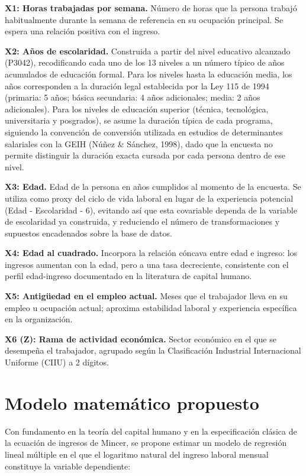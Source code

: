\documentclass[
  spanish,
  letterpaper,
  DIV=11,
  numbers=noendperiod]{scrartcl}
\begin{document}
\textbf{X1: Horas trabajadas por semana.} Número de horas que la persona
trabajó habitualmente durante la semana de referencia en su ocupación
principal. Se espera una relación positiva con el ingreso.

\textbf{X2: Años de escolaridad.} Construida a partir del nivel
educativo alcanzado (P3042), recodificando cada uno de los 13 niveles a
un número típico de años acumulados de educación formal. Para los
niveles hasta la educación media, los años corresponden a la duración
legal establecida por la Ley 115 de 1994 (primaria: 5 años; básica
secundaria: 4 años adicionales; media: 2 años adicionales). Para los
niveles de educación superior (técnica, tecnológica, universitaria y
posgrados), se asume la duración típica de cada programa, siguiendo la
convención de conversión utilizada en estudios de determinantes
salariales con la GEIH (Núñez \& Sánchez, 1998), dado que la encuesta no
permite distinguir la duración exacta cursada por cada persona dentro de
ese nivel.

\textbf{X3: Edad.} Edad de la persona en años cumplidos al momento de la
encuesta. Se utiliza como proxy del ciclo de vida laboral en lugar de la
experiencia potencial (Edad - Escolaridad - 6), evitando así que esta
covariable dependa de la variable de escolaridad ya construida, y
reduciendo el número de transformaciones y supuestos encadenados sobre
la base de datos.

\textbf{X4: Edad al cuadrado.} Incorpora la relación cóncava entre edad
e ingreso: los ingresos aumentan con la edad, pero a una tasa
decreciente, consistente con el perfil edad-ingreso documentado en la
literatura de capital humano.

\textbf{X5: Antigüedad en el empleo actual.} Meses que el trabajador
lleva en su empleo u ocupación actual; aproxima estabilidad laboral y
experiencia específica en la organización.

\textbf{X6 (Z): Rama de actividad económica.} Sector económico en el que
se desempeña el trabajador, agrupado según la Clasificación Industrial
Internacional Uniforme (CIIU) a 2 dígitos.

\section{Modelo matemático
propuesto}\label{modelo-matemuxe1tico-propuesto}

Con fundamento en la teoría del capital humano y en la especificación
clásica de la ecuación de ingresos de Mincer, se propone estimar un
modelo de regresión lineal múltiple en el que el logaritmo natural del
ingreso laboral mensual constituye la variable dependiente:
\end{document}
